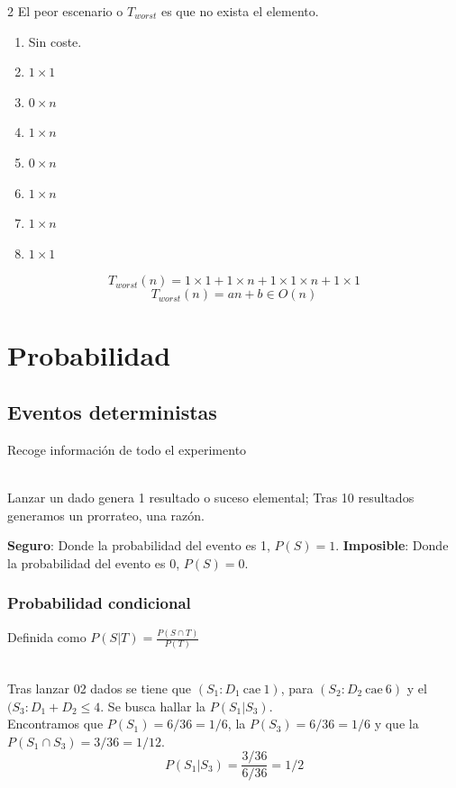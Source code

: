 \begin{example}
\begin{multicols}{2}
		\columnbreak
		El peor escenario o $T_{worst}$ es que no exista el elemento.
		\begin{enumerate}
			\item Sin coste.
			\item $1\times1$
			\item $0\times n$
			\item $1\times n$
			\item $0\times n$
			\item $1\times n$
			\item $1\times n$
			\item $1\times1$
		\end{enumerate}
	\end{multicols}
	$$
		T_{worst}(n)= 1\times1+1\times n+1\times 1\times n+1\times1
	$$ $$
		T_{worst}(n)= an+b\in O(n)
	$$
\end{example}


\section{Probabilidad}
\subsection{Eventos deterministas}
\begin{definition}
	Recoge información de todo el experimento
	\begin{example}[Dados]~
		\\Lanzar un dado genera 1 resultado o suceso elemental; Tras 10 resultados generamos un prorrateo, una razón.
	\end{example}
\end{definition}

\begin{definition}[Sucesos]
	\textbf{Seguro}: Donde la probabilidad del evento es 1, $P(S)=1$.
	\textbf{Imposible}: Donde la probabilidad del evento es 0, $P(S)=0$.
\end{definition}

\subsubsection{Probabilidad condicional}
Definida como $P(S|T)=\frac{P(S\cap T)}{P(T)}$

\begin{example}[Dados]~
	\\Tras lanzar 02 dados se tiene que $(S_1:D_1~\text{cae}~1)$, para $(S_2:D_2~\text{cae}~6)$ y el $(S_3:D_1+D_2\le4$. Se busca hallar la $P(S_1|S_3)$.
	\\Encontramos que $P(S_1)=6/36=1/6$, la $P(S_3)=6/36=1/6$ y que la $P(S_1\cap S_3)=3/36=1/12$.
	$$
		P(S_1|S_3)=\frac{3/36}{6/36}=1/2
	$$
\end{example}


